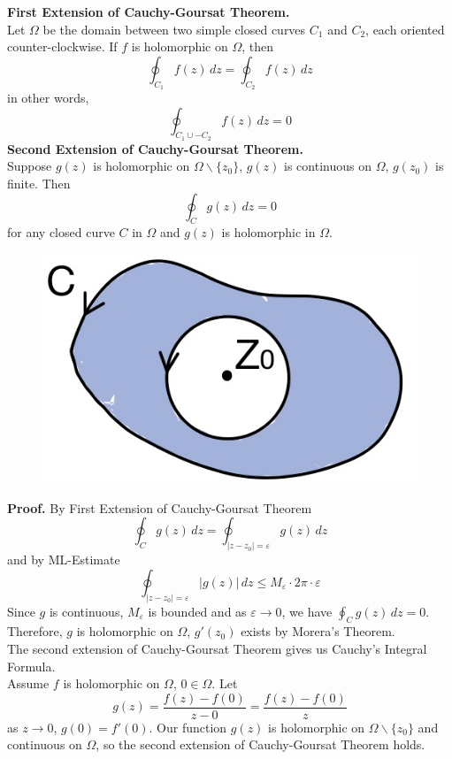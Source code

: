 \documentclass[11pt]{article}
\begin{document}
\textbf{First Extension of Cauchy-Goursat Theorem.} \\
Let $\Omega$ be the domain between two simple closed curves $C_1$ and $C_2$, each oriented counter-clockwise. If $f$ is holomorphic on $\Omega$, then 
$$ \oint_{C_1}f(z) \,dz = \oint_{C_2}f(z) \,dz $$
in other words, 
$$\oint_{C_1 \cup -C_2}f(z) \, dz = 0$$
\newline
\textbf{Second Extension of Cauchy-Goursat Theorem. } \\
Suppose $g(z)$ is holomorphic on $\Omega \backslash \{z_0\}$, $g(z)$ is continuous on $\Omega$, $g(z_0)$ is finite. Then
$$\oint_C g(z) \,dz = 0$$
for any closed curve $C$ in $\Omega$ and $g(z)$ is holomorphic in $\Omega$. 
\begin{figure}[H]
\includegraphics[scale = 0.2]{13_4}
\centering
\end{figure}
\textbf{Proof.} By First Extension of Cauchy-Goursat Theorem 
$$\oint_C g(z) \,dz = \oint_{|z - z_0| = \varepsilon} g(z) \, dz$$
and by ML-Estimate
$$\oint_{|z - z_0| = \varepsilon} |g(z)| \, dz \leqslant M_{\varepsilon}\cdot 2\pi \cdot \varepsilon$$
Since $g$ is continuous, $M_\varepsilon$ is bounded and as $\varepsilon \to 0$, we have 
$\oint_C g(z) \,dz = 0$.
Therefore, $g$ is holomorphic on $\Omega$, $g'(z_0)$ exists by Morera's Theorem. \\
The second extension of Cauchy-Goursat Theorem gives us Cauchy's Integral Formula. \\
Assume $f$ is holomorphic on $\Omega$, $0 \in \Omega$. Let 
$$g(z) = \frac{f(z) - f(0)}{z - 0} = \frac{f(z) - f(0)}{z}$$ 
as $z \to 0$, $g(0) = f'(0)$. Our function $g(z)$ is holomorphic on $\Omega \backslash \{z_0\}$ and continuous on $\Omega$, so the second extension of Cauchy-Goursat Theorem holds. \\
\end{document}
